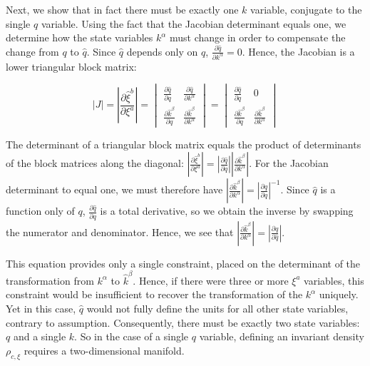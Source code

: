 \documentclass[letterpaper]{article}
\begin{document}
Next, we show that in fact there must be exactly one $k$ variable, conjugate to the single $q$ variable. Using the fact that the Jacobian determinant equals one, we determine how the state variables $k^\alpha$ must change in order to compensate the change from $q$ to $\hat q$. Since $\hat{q}$ depends only on $q$, $\frac{\partial \hat{q}}{\partial k^\alpha} = 0$. Hence, the Jacobian is a lower triangular block matrix: 



\begin{equation}
|J| = \left|\frac{\partial \hat{\xi}^b}{\partial \xi^a} \right| = \begin{vmatrix}
\frac{\partial \hat{q}}{\partial q} & \frac{\partial \hat{q}}{\partial k^\alpha} \\
\frac{\partial \hat{k}^\beta}{\partial q} & \frac{\partial \hat{k}^\beta}{\partial  k^\alpha} 
\end{vmatrix} = \begin{vmatrix}
\frac{\partial \hat{q}}{\partial q} & 0 \\
\frac{\partial \hat{k}^\beta}{\partial q} & \frac{\partial \hat{k}^\beta}{\partial  k^\alpha}
\end{vmatrix}
\end{equation}

\noindent
The determinant of a triangular block matrix equals the product of determinants of the block matrices along the diagonal: $ \left|\frac{\partial \hat{\xi}^b}{\partial \xi^a} \right| =  \left|\frac{\partial \hat{q}}{\partial q}\right| \left|\frac{\partial \hat{k}^\beta}{\partial k^\alpha}\right|$. For the Jacobian determinant to equal one, we must therefore have  $\left|\frac{\partial \hat{k}^\beta}{\partial k^\alpha} \right| =   \left|\frac{\partial \hat{q}}{\partial q}\right|^{-1}$. Since $\hat q$ is a function only of $q$, $\frac{\partial \hat{q}}{\partial q}$ is a total derivative, so we obtain the inverse by swapping the numerator and denominator. Hence, we see that $\left|\frac{\partial \hat{k}^\beta}{\partial k^\alpha} \right| = \left|\frac{\partial q}{\partial \hat q} \right|$. 

This equation provides only a single constraint, placed on the determinant of the transformation from $k^\alpha$ to $\hat{k}^\beta$. Hence, if there were three or more $\xi^a$ variables, this constraint would be insufficient to recover the transformation of the $k^\alpha$ uniquely. Yet in this case, $\hat q$  would not fully define the units for all other state variables, contrary to assumption. Consequently, there must be exactly two state variables: $q$ and a single $k$. So in the case of a single $q$ variable, defining an invariant density $\rho_{c, \xi}$ requires a two-dimensional manifold.
\end{document}
